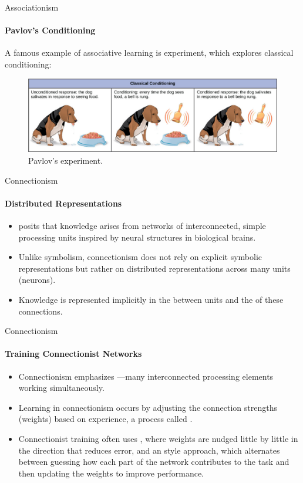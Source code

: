 \begin{frame}{Associationism}
    \framesubtitle{Pavlov’s Conditioning}
    A famous example of associative learning is  experiment, which explores classical conditioning:
    \begin{figure}
        \centering
        \includegraphics[width=\linewidth]{images/pavlov-dog.jpg}
        \caption{Pavlov's experiment. }
    \end{figure}
\end{frame}

\begin{frame}{Connectionism}
    \framesubtitle{Distributed Representations}
    \begin{itemize}
        \item {} posits that knowledge arises from networks of interconnected, simple processing units inspired by neural structures in biological brains.
        \item Unlike symbolism, connectionism does not rely on explicit symbolic representations but rather on distributed representations across many units (neurons).
        \item Knowledge is represented implicitly in the  between units and the  of these connections.
    \end{itemize}
\end{frame}

\begin{frame}{Connectionism}
    \framesubtitle{Training Connectionist Networks}
    \begin{itemize}
        \item Connectionism emphasizes —many interconnected processing elements working simultaneously.
        \item Learning in connectionism occurs by adjusting the connection strengths (weights) based on experience, a process called .
        \item Connectionist training often uses , where weights are nudged little by little in the direction that reduces error, and an  style approach, which alternates between guessing how each part of the network contributes to the task and then updating the weights to improve performance.
    \end{itemize}
\end{frame}

